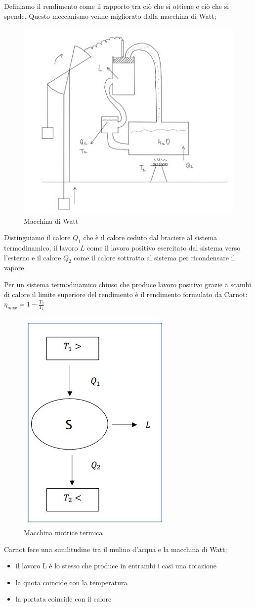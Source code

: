 \documentclass[a4paper]{article}
\numberwithin{equation}{section}%
\begin{document}
Definiamo il rendimento come il rapporto tra ciò che si ottiene e ciò che si spende.
Questo meccanismo venne migliorato dalla macchina di Watt;

\begin{figure}[H]
	\begin{center}
		\caption{Macchina di Watt}
		\includegraphics[width=0.6\columnwidth]{macchinadiWatt.jpg}
	\end{center}
\end{figure}

Distinguiamo il calore $Q_1$ che è il calore ceduto dal braciere al sistema termodinamico, il lavoro $L$ come il lavoro positivo esercitato dal sistema verso l'esterno e il calore $Q_2$ come il calore sottratto al sistema per ricondensare il vapore.

Per un sistema termodinamico chiuso che produce lavoro positivo grazie a scambi di calore il limite superiore del rendimento è il rendimento formulato da Carnot: $\eta_{max}=1-\frac{T_2}{T_1}$

\begin{figure}[H]
	\begin{center}
		\caption{Macchina motrice termica}
		\includegraphics[width=0.2\columnwidth]{sistema.jpg}
	\end{center}
\end{figure}

Carnot fece una similitudine tra il mulino d'acqua e la macchina di Watt;
\begin{itemize}
	\item il lavoro L è lo stesso che produce in entrambi i casi una rotazione
	\item la quota coincide con la temperatura
	\item la portata coincide con il calore
\end{itemize}
\end{document}

